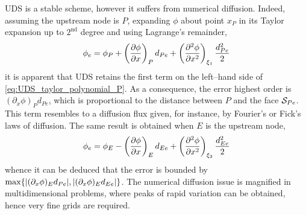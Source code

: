 UDS is a stable scheme, however it suffers from numerical diffusion. Indeed,
assuming the upstream node is $P$, expanding $\phi$ about point $x_P$ in its
Taylor expansion up to $2^\text{nd}$ degree and using Lagrange's remainder,
\begin{equation} \label{eq:UDS_taylor_polynomial_P}
	\phi_e = 
	\phi_P + \left(\pdv{\phi}{x}\right)_P d_{Pe} + 
	\left(\pdv[2]{\phi}{x}\right)_{\xi_1} \frac{d_{Pe}^2}{2}
\end{equation}
it is apparent that UDS retains the first term on the left--hand side of
\eqref{eq:UDS_taylor_polynomial_P}. As a consequence, the error highest order is
$(\partial_x \phi)_P d_{Pe}$, which is proportional to the distance between $P$
and the face $\mathcal{S}_{Pe}$. This term resembles to a diffusion flux given, for
instance, by Fourier's or Fick's laws of diffusion. The same result is obtained
when $E$ is the upstream node,
\begin{equation*}
	\phi_e = 
	\phi_E - \left(\pdv{\phi}{x}\right)_E d_{Ee} + \left(\pdv[2]{\phi}{x}\right)_{\xi_2} \frac{d_{Ee}^2}{2}
\end{equation*}
whence it can be deduced that the error is bounded by $\max\{ \abs{(\partial_x
\phi)_E d_{Pe}}, \abs{(\partial_x \phi)_E d_{Ee}}\}$. The numerical diffusion
issue is magnified in multidimensional problems, where peaks of rapid variation
can be obtained, hence very fine grids are required. 